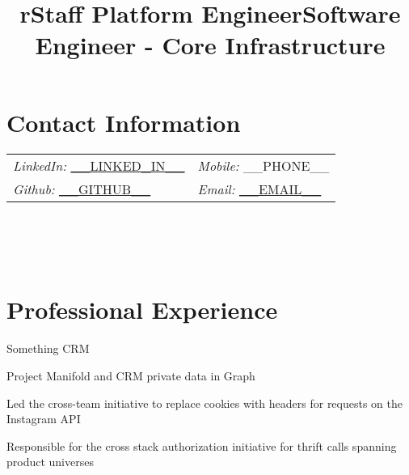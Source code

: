 \documentclass[margin,line]{resume}
\newenvironment{bullet-list}{
  \begin{list}{$\bullet$}{%
      \setlength{\itemsep}{0in}
      \setlength{\parsep}{0in} \setlength{\parskip}{0in}
      \setlength{\topsep}{0in} \setlength{\partopsep}{0in}
      \setlength{\leftmargin}{0.2in}}}{\end{list}}
\begin{document}
\begin{resume}

\section{\sc Contact Information}
\vspace{.05in}
\begin{tabular}{@{}p{3.87in}p{2in}}
    {\it LinkedIn:} \href{https://www.__LINKEDIN__}{__LINKED_IN__}     & \hfill{\it Mobile:} __PHONE__\\
{\it Github:} \href{https://__GITHUB__}{__GITHUB__}     & \hfill{\it Email:} \href{mailto:__EMAIL__}{__EMAIL__}\\
\end{tabular}

\begin{format}
  \title{r}\\
  \\
  \body\\
\end{format}

\section{\sc Professional Experience}

\title{Staff Platform Engineer}
\begin{position}
\vspace{-.3cm}
\begin{bullet-list}
\item Something CRM
\item Project Manifold and CRM private data in Graph
\end{bullet-list}
\end{position}

\title{Software Engineer - Core Infrastructure}
\begin{position}
\vspace{-.3cm}
\begin{bullet-list}
\item Led the cross-team initiative to replace cookies with headers for
requests on the Instagram API
\item Responsible for the cross stack authorization initiative for thrift
calls spanning product universes
\end{bullet-list}
\end{position}


\end{resume}
\end{document}
